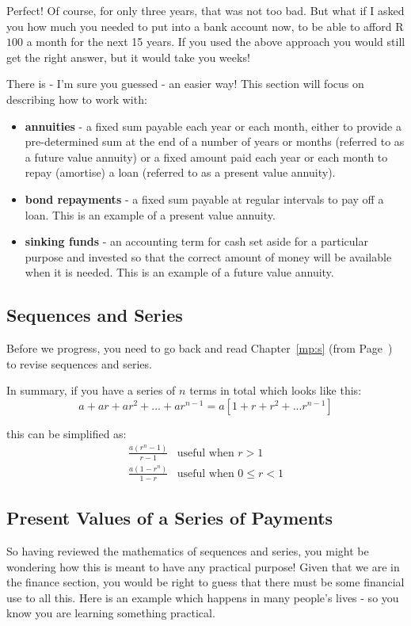 Perfect! Of course, for only three years, that was not too bad. But what if I asked you how much you needed to put into a bank account now, to be able to afford R$100$ a month for the next 15 years. If you used the above approach you would still get the right answer, but it would take you weeks!

There is - I'm sure you guessed - an easier way! This section will focus on describing how to work with:
\begin{itemize}
\item{\textbf{annuities} - a fixed sum payable each year or each month, either to provide a pre-determined sum at the end of a number of years or months (referred to as a future value annuity) or a fixed amount paid each year or each month to repay (amortise) a loan (referred to as a present value annuity).}
\item{\textbf{bond repayments} - a fixed sum payable at regular intervals to pay off a loan. This is an example of a present value annuity.}
\item{\textbf{sinking funds} - an accounting term for cash set aside for a particular purpose and invested so that the correct amount of money will be available when it is needed. This is an example of a future value annuity.}
\end{itemize}

\subsection{Sequences and Series}
\label{m:f:ss}
Before we progress, you need to go back and read Chapter~\ref{mp:s} (from Page~\pageref{mp:s}) to revise sequences and series.

In summary, if you have a series of $n$ terms in total which looks like this:
\begin{equation*}
a + ar + ar^2 + ... + ar^{n-1} = a [ 1 + r + r^2 + ... r^{n-1} ]
\end{equation*}

this can be simplified as:
\begin{eqnarray*}
\frac{a (r^n - 1)}{r-1} &\mbox{useful when $r>1$}\\
\frac{a (1 - r^n)}{1-r} &\mbox{useful when $0\le r <1$}
\end{eqnarray*}

\subsection{Present Values of a Series of Payments}\label{presentvalues}
So having reviewed the mathematics of sequences and series, you might be wondering how this is meant to have any practical purpose! Given that we are in the finance section, you would be right to guess that there must be some financial use to all this. Here is an example which happens in many people's lives - so you know you are learning something practical.

